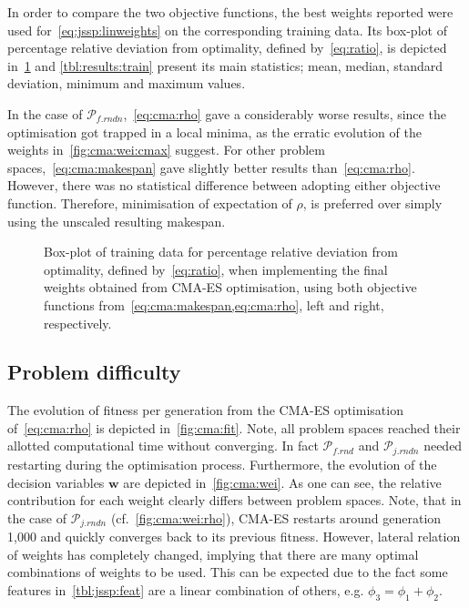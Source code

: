 \documentclass[a4paper,twoside]{article}
\renewcommand{\vec}[1]{\mathbf{#1}}
\begin{document}
In order to compare the two objective functions, the best weights reported were used for~\cref{eq:jssp:linweights} on the corresponding training data. Its box-plot of percentage relative deviation from optimality, defined by~\cref{eq:ratio}, is depicted in~\cref{fig:cma:trainboxpl} and \cref{tbl:results:train} present its main statistics; mean, median, standard deviation, minimum and maximum values.

In the case of $\mathcal{P}_{f.rndn}$,~\cref{eq:cma:rho}  gave a considerably worse results, since the optimisation got trapped in a local minima, as the erratic evolution of the weights in~\cref{fig:cma:wei:cmax} suggest.
For other problem spaces,~\cref{eq:cma:makespan} gave slightly better results than~\cref{eq:cma:rho}. However, there was no statistical difference between adopting either objective function. Therefore, minimisation of expectation of $\rho$, is preferred over simply using the unscaled resulting makespan. 

\begin{figure}
\caption{Box-plot of training data for percentage relative deviation from optimality, defined by~\cref{eq:ratio}, when implementing the final weights obtained from CMA-ES optimisation, using both objective functions from~\cref{eq:cma:makespan,eq:cma:rho}, left and right, respectively.}\label{fig:cma:trainboxpl}
\end{figure}



\subsection{Problem difficulty}\label{sec:expr:data}
The evolution of fitness per generation from the CMA-ES optimisation of~\cref{eq:cma:rho} is depicted in~\cref{fig:cma:fit}. Note, all problem spaces reached their allotted computational time without converging. In fact $\mathcal{P}_{f.rnd}$ and $\mathcal{P}_{j.rndn}$ needed restarting during the optimisation process. 
Furthermore, the  evolution of the decision variables $\vec{w}$ are depicted in~\cref{fig:cma:wei}. As one can see, the relative contribution for each weight clearly differs between problem spaces. Note, that in the case of $\mathcal{P}_{j.rndn}$ (cf.~\cref{fig:cma:wei:rho}), CMA-ES restarts around generation 1,000 and quickly converges back to its previous fitness. However, lateral relation of weights has completely changed, implying that there are many optimal combinations of weights to be used. This can be expected due  to the fact some features in~\cref{tbl:jssp:feat} are a linear combination of others, e.g. $\phi_3=\phi_1+\phi_2$.
\end{document}
